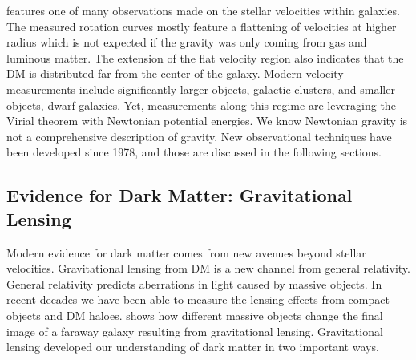  features one of many observations made on the stellar velocities within galaxies.
The measured rotation curves mostly feature a flattening of velocities at higher radius which is not expected if the gravity was only coming from gas and luminous matter.
The extension of the flat velocity region also indicates that the DM is distributed far from the center of the galaxy.
Modern velocity measurements include significantly larger objects, galactic clusters, and smaller objects, dwarf galaxies.
Yet, measurements along this regime are leveraging the Virial theorem with Newtonian potential energies.
We know Newtonian gravity is not a comprehensive description of gravity.
New observational techniques have been developed since 1978, and those are discussed in the following sections.

\subsection{Evidence for Dark Matter: Gravitational Lensing\label{sec:ev4dm_lens}}

Modern evidence for dark matter comes from new avenues beyond stellar velocities.
Gravitational lensing from DM is a new channel from general relativity.
General relativity predicts aberrations in light caused by massive objects.
In recent decades we have been able to measure the lensing effects from compact objects and DM haloes.
 shows how different massive objects change the final image of a faraway galaxy resulting from gravitational lensing.
Gravitational lensing developed our understanding of dark matter in two important ways.


